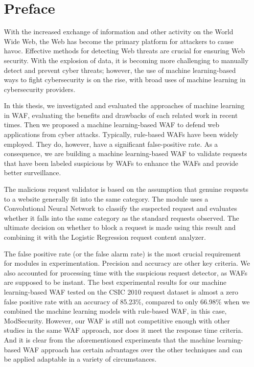 \chapter*{Preface}
\thispagestyle{fancy}
\label{tom_tat}
\hspace*{5cm}

With the increased exchange of information and other activity on the World Wide Web, the Web has become the primary platform for attackers to cause havoc. Effective methods for detecting Web threats are crucial for ensuring Web security. With the explosion of data, it is becoming more challenging to manually detect and prevent cyber threats; however, the use of machine learning-based ways to fight cybersecurity is on the rise, with broad uses of machine learning in cybersecurity providers. 

In this thesis, we investigated and evaluated the approaches of machine learning in WAF, evaluating the benefits and drawbacks of each related work in recent times. Then we proposed a machine learning-based WAF to defend web applications from cyber attacks. Typically, rule-based WAFs have been widely employed. They do, however, have a significant false-positive rate. As a consequence, we are building a machine learning-based WAF to validate requests that have been labeled suspicious by WAFs to enhance the WAFs and provide better surveillance. 

The malicious request validator is based on the assumption that genuine requests to a website generally fit into the same category. The module uses a Convolutional Neural Network to classify the suspected request and evaluates whether it falls into the same category as the standard requests observed. The ultimate decision on whether to block a request is made using this result and combining it with the Logistic Regression request content analyzer. 

The false positive rate (or the false alarm rate) is the most crucial requirement for modules in experimentation. Precision and accuracy are other key criteria. We also accounted for processing time with the suspicious request detector, as WAFs are supposed to be instant. The best experimental results for our machine learning-based WAF tested on the CSIC 2010 request dataset is almost a zero false positive rate with an accuracy of 85.23\%, compared to only 66.98\% when we combined the machine learning models with rule-based WAF, in this case, ModSecurity. However, our WAF is still not competitive enough with other studies in the same WAF approach, nor does it meet the response time criteria. And it is clear from the aforementioned experiments that the machine learning-based WAF approach has certain advantages over the other techniques and can be applied adaptable in a variety of circumstances.
	
\cleardoublepage